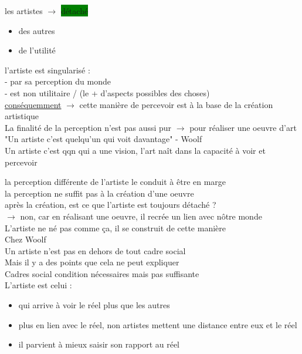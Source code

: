 \documentclass[a4paper,twocolumn,landscape]{article}
\begin{document}
\noindent 
les artistes \(\rightarrow\) \colorbox{green}{détaché} \begin{itemize}
  \item des autres \\
  \item de l'utilité \\
\end{itemize}
l'artiste est singularisé :\\
- par sa perception du monde \\
- est non utilitaire / (le + d'aspects possibles des choses)\\
\underline{conséquemment} \(\rightarrow\) cette manière de 
percevoir est à la base de la création artistique\\
La finalité de la perception n'est pas aussi pur \(\rightarrow\) 
pour réaliser une oeuvre d'art\\
"Un artiste c'est quelqu'un qui voit davantage" - Woolf\\
Un artiste c'est qqn qui a une vision, l'art naît dans la capacité
à voir et percevoir

\noindent
la perception différente de l'artiste le conduit à être en marge\\
 
\noindent la perception ne suffit pas à la création d'une oeuvre\\
après la création, est ce que l'artiste est toujours détaché ? \\
\(\rightarrow\) non, car en réalisant une oeuvre, il recrée un
lien avec nôtre monde \\
L'artiste ne né pas comme ça, il se construit de cette manière\\

\noindent
Chez Woolf\\
Un artiste n'est pas en dehors de tout cadre social\\
Mais il y a des points que cela ne peut expliquer \\
Cadres social condition nécessaires mais pas suffisante\\
L'artiste est celui : 
\begin{itemize}
  \item qui arrive à voir le réel plus que les autres\\
  \item plus en lien avec le réel, non artistes mettent une distance entre eux et le réel \\ 
  \item il parvient à mieux saisir son rapport au réel 
\end{itemize}
\end{document}
